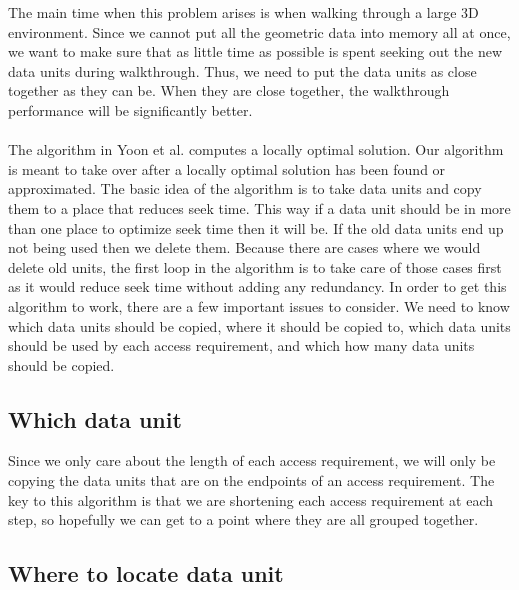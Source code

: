 \documentclass[11pt,psfig]{article}
\begin{document}
The main time when this problem arises is when walking through a large 3D environment. Since we cannot put all the geometric data into memory all at once, we want to make sure that as little time as possible is spent seeking out the new data units during walkthrough. Thus, we need to put the data units as close together as they can be. When they are close together, the walkthrough performance will be significantly better. \\
\\
The algorithm in Yoon et al. computes a locally optimal solution. Our algorithm is meant to take over after a locally optimal solution has been found or approximated. The basic idea of the algorithm is to take data units and copy them to a place that reduces seek time. This way if a data unit should be in more than one place to optimize seek time then it will be. If the old data units end up not being used then we delete them. Because there are cases where we would delete old units, the first loop in the algorithm is to take care of those cases first as it would reduce seek time without adding any redundancy. In order to get this algorithm to work, there are a few important issues to consider. We need to know which data units should be copied, where it should be copied to, which data units should be used by each access requirement, and which how many data units should be copied. 

\subsection*{Which data unit}

Since we only care about the length of each access requirement, we will only be copying the data units that are on the endpoints of an access requirement. The key to this algorithm is that we are shortening each access requirement at each step, so hopefully we can get to a point where they are all grouped together. 

\subsection*{Where to locate data unit}
\end{document}
